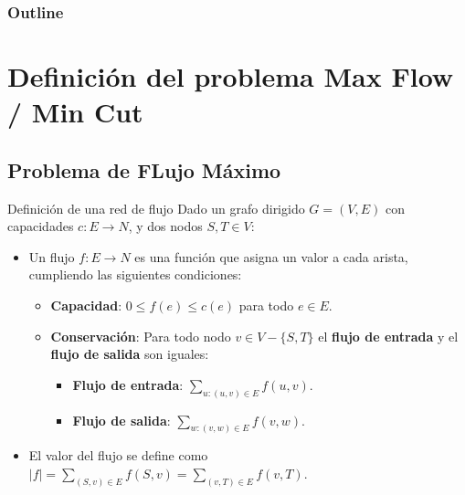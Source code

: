 \documentclass{beamer}
\begin{document}
\begin{frame}
\frametitle{Outline}
\tableofcontents
\end{frame}


\section{Definición del problema Max Flow / Min Cut}
    \subsection{Problema de FLujo Máximo}

\begin{frame}{Definición de una red de flujo}
    Dado un grafo dirigido $G = (V, E)$ con capacidades $c: E \to N$, y dos nodos $S, T \in V$:
    \begin{itemize}
        \item Un flujo $f: E \to N$ es una función que asigna un valor a cada arista, cumpliendo las siguientes condiciones:
        \begin{itemize}
            \item \textbf{Capacidad}: $0 \leq f(e) \leq c(e)$ para todo $e \in E$.
            \item \textbf{Conservación}: Para todo nodo $v \in V - \{S, T\}$ el \textbf{flujo de entrada} y el \textbf{flujo de salida} son iguales:
            \begin{itemize}
                \item \textbf{Flujo de entrada}: $\sum_{u: (u,v) \in E} f(u,v)$.
                \item \textbf{Flujo de salida}: $\sum_{w: (v,w) \in E} f(v,w)$.
            \end{itemize}
        \end{itemize}
        \pause
        \item El valor del flujo se define como $|f| = \sum_{(S,v) \in E} f(S,v) = \sum_{(v,T) \in E} f(v,T)$.
    \end{itemize}
\end{frame}
\end{document}
